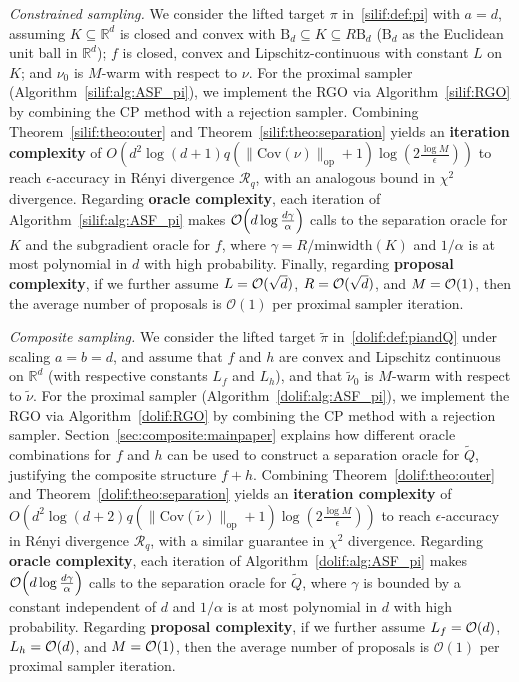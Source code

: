 \documentclass[11pt,letterpaper]{article}
\newcommand{\ball}{\mathrm{B}}
\newcommand{\R}{\mathbb{R}}
\newcommand{\cov}[1]{\mathrm{Cov}{\left( #1\right)}}
\newcommand{\Q}{\widetilde{Q}}
\begin{document}
\emph{Constrained sampling.}
We consider the lifted target $\pi$ in~\eqref{silif:def:pi} with $a=d$, assuming $K\subseteq\R^d$ is closed and convex with $\ball_d\subseteq K\subseteq R\ball_d$ ($\ball_d$ as the Euclidean unit ball in $\R^d$); $f$ is closed, convex and Lipschitz-continuous with constant $L$ on $K$; and $\nu_0$ is $M$-warm with respect to $\nu$. For the proximal sampler (Algorithm~\ref{silif:alg:ASF_pi}), we implement the RGO via Algorithm~\ref{silif:RGO} by combining the CP method with a rejection sampler. Combining Theorem~\ref{silif:theo:outer} and Theorem~\ref{silif:theo:separation} yields an \textbf{iteration complexity} of $O\!\left(d^2\log(d+1) q\left(\|\cov{\nu}\|_{\mathrm{op}}+1\right)\log\!\left(2\frac{\log M}{\epsilon}\right)\right)$ to reach $\epsilon$-accuracy in R\'enyi divergence $\mathcal{R}_q$, with an analogous bound in $\chi^2$ divergence. Regarding \textbf{oracle complexity}, each iteration of Algorithm~\ref{silif:alg:ASF_pi}  makes ${\cal O}\!\left(d\log\frac{d\gamma}{\alpha}\right)$ calls to the separation oracle for $K$ and the subgradient oracle for $f$, where $\gamma=R/\mbox{minwidth}(K)$ and $1/\alpha$ is at most polynomial in $d$ with high probability. Finally, regarding \textbf{proposal complexity}, if we further assume $L={\cal O}(\sqrt{d})$, $R={\cal O}(\sqrt{d})$, and $M={\cal O}(1)$, then the average number of proposals is $\mathcal{O}(1)$ per proximal sampler iteration.



\emph{Composite sampling.} We consider the lifted target $\tilde{\pi}$ in~\eqref{dolif:def:piandQ} under scaling $a=b=d$, and assume that $f$ and $h$ are convex and Lipschitz continuous on $\R^d$ (with respective constants $L_f$ and $L_h$), and that $\tilde{\nu}_0$ is $M$-warm with respect to $\tilde{\nu}$. For the proximal sampler (Algorithm~\ref{dolif:alg:ASF_pi}), we implement the RGO via Algorithm~\ref{dolif:RGO} by combining the CP method with a rejection sampler. Section~\ref{sec:composite:mainpaper} explains how different oracle combinations for $f$ and $h$ can be used to construct a separation oracle for $\Q$, justifying the composite structure $f+h$. Combining Theorem~\ref{dolif:theo:outer} and Theorem~\ref{dolif:theo:separation} yields an \textbf{iteration complexity} of $O\!\left(d^2\log(d+2) q\left(\|\cov{\tilde{\nu}}\|_{\mathrm{op}}+1\right)\log\!\left(2\frac{\log M}{\epsilon}\right)\right)$ to reach $\epsilon$-accuracy in R\'enyi divergence $\mathcal{R}_q$, with a similar guarantee in $\chi^2$ divergence. Regarding \textbf{oracle complexity}, each iteration of Algorithm~\ref{dolif:alg:ASF_pi} makes ${\cal O}\!\left(d\log\frac{d\gamma}{\alpha}\right)$ calls to the separation oracle for $\Q$, where $\gamma$ is bounded by a constant independent of $d$ and $1/\alpha$ is at most polynomial in $d$ with high probability. Regarding \textbf{proposal complexity}, if we further assume $L_f={\cal O}(d)$, $L_h={\cal O}(d)$, and $M={\cal O}(1)$, then the average number of proposals is $\mathcal{O}(1)$ per proximal sampler iteration. 
\end{document}
